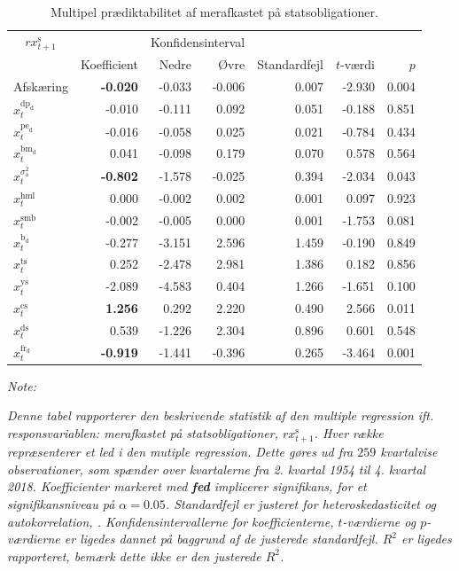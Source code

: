 \documentclass[
  a4paper,
  oneside]{memoir}
\begin{document}
\begin{table}[!h]

\caption{\label{tab:MULT-s}Multipel prædiktabilitet af merafkastet på statsobligationer.}
\centering
\begin{threeparttable}
\begin{tabular}[t]{lrrrrrr}
\toprule
\multicolumn{1}{c}{$rx_{t+1}^{\text{s}}$} & \multicolumn{1}{c}{ } & \multicolumn{2}{c}{Konfidensinterval} & \multicolumn{3}{c}{ } \\
\cmidrule(l{3pt}r{3pt}){1-1} \cmidrule(l{3pt}r{3pt}){3-4}
  & Koefficient & Nedre & Øvre & Standardfejl & $t$-værdi & $p$\\
\midrule
\rowcolor{gray!6}  Afskæring & \textbf{-0.020} & -0.033 & -0.006 & 0.007 & -2.930 & 0.004\\
$x_t^{\text{dp}_{\text{d}}}$ & -0.010 & -0.111 & 0.092 & 0.051 & -0.188 & 0.851\\
\rowcolor{gray!6}  $x_t^{\text{pe}_{\text{d}}}$ & -0.016 & -0.058 & 0.025 & 0.021 & -0.784 & 0.434\\
$x_t^{\text{bm}_{\text{d}}}$ & 0.041 & -0.098 & 0.179 & 0.070 & 0.578 & 0.564\\
\rowcolor{gray!6}  $x_t^{\sigma_{\text{a}}^2}$ & \textbf{-0.802} & -1.578 & -0.025 & 0.394 & -2.034 & 0.043\\
$x_t^{\text{hml}}$ & 0.000 & -0.002 & 0.002 & 0.001 & 0.097 & 0.923\\
\rowcolor{gray!6}  $x_t^{\text{smb}}$ & -0.002 & -0.005 & 0.000 & 0.001 & -1.753 & 0.081\\
$x_t^{\text{b}_{\text{d}}}$ & -0.277 & -3.151 & 2.596 & 1.459 & -0.190 & 0.849\\
\rowcolor{gray!6}  $x_t^{\text{ts}}$ & 0.252 & -2.478 & 2.981 & 1.386 & 0.182 & 0.856\\
$x_t^{\text{ys}}$ & -2.089 & -4.583 & 0.404 & 1.266 & -1.651 & 0.100\\
\rowcolor{gray!6}  $x_t^{\text{cs}}$ & \textbf{ 1.256} & 0.292 & 2.220 & 0.490 & 2.566 & 0.011\\
$x_t^{\text{ds}}$ & 0.539 & -1.226 & 2.304 & 0.896 & 0.601 & 0.548\\
\rowcolor{gray!6}  $x_t^{\text{fr}_{\text{d}}}$ & \textbf{-0.919} & -1.441 & -0.396 & 0.265 & -3.464 & 0.001\\
\bottomrule
\end{tabular}
\begin{tablenotes}
\item \textit{Note: } 
\item \textit{Denne tabel rapporterer den beskrivende statistik af den multiple regression ift. responsvariablen: merafkastet på statsobligationer, $rx_{t+1}^{\text{s}}$. Hver række repræsenterer et led i den mutiple regression. Dette gøres ud fra $259$ kvartalvise observationer, som spænder over kvartalerne fra 2. kvartal 1954 til 4. kvartal 2018. Koefficienter markeret med \textbf{fed} implicerer signifikans, for et signifikansniveau på $\alpha=0.05$. Standardfejl er justeret for heteroskedasticitet og autokorrelation, \citep{Newey1987}. Konfidensintervallerne for koefficienterne, $t$-værdierne og $p$-værdierne er ligedes dannet på baggrund af de justerede standardfejl. $R^2$ er ligedes rapporteret, bemærk dette ikke er den justerede $R^2$.}

\end{tablenotes}
\end{threeparttable}
\end{table}
\end{document}
